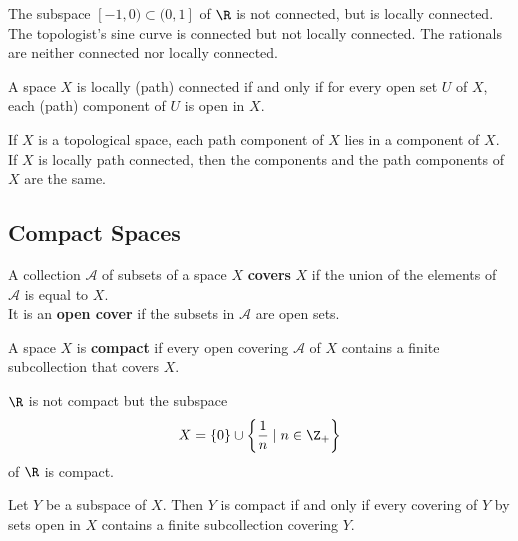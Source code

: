 \begin{eg}
The subspace $[-1, 0) \subset (0, 1]$ of $\R$ is not connected, but is locally connected. \\

The topologist's sine curve is connected but not locally connected. The rationals are neither connected nor locally connected.
\end{eg}

\begin{theorem}
A space $X$ is locally (path) connected if and only if for every open set $U$ of $X$, each (path) component of $U$ is open in $X$.
\end{theorem}

\begin{theorem}
If $X$ is a topological space, each path component of $X$ lies in a component of $X$. If $X$ is locally path connected, then the components and the path components of $X$ are the same.
\end{theorem}


\subsection{Compact Spaces}

\begin{definition}
A collection $\mathscr{A}$ of subsets of a space $X$ \textbf{covers} $X$ if the union of the elements of $\mathscr{A}$ is equal to $X$. \\

It is an \textbf{open cover} if the subsets in $\mathscr{A}$ are open sets.
\end{definition}

\begin{definition}[Compact]
A space $X$ is \textbf{compact} if every open covering $\mathscr{A}$ of $X$ contains a finite subcollection that covers $X$.
\end{definition}

\begin{eg}
$\R$ is not compact but the subspace 
\[
    X = \{ 0 \} \cup \left\{ \frac{1}{n} \mid n \in \Z_+ \right\}  
\]
of $\R$ is compact.
\end{eg}

\begin{lemma}
Let $Y$ be a subspace of $X$. Then $Y$ is compact if and only if every covering of $Y$ by sets open in $X$ contains a finite subcollection covering $Y$.
\end{lemma}

